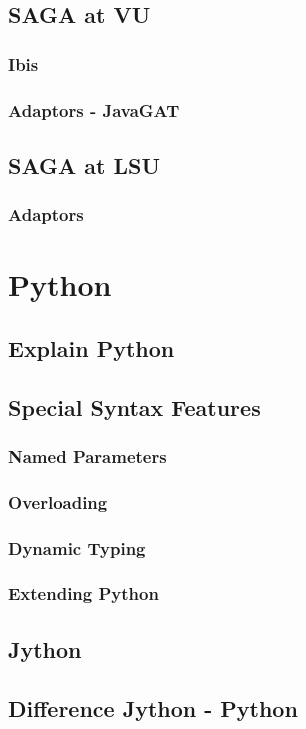 \documentclass[a4paper,11pt,onecolumn,notitlepage]{report}
\begin{document}
\subsection{SAGA at VU}
\subsubsection{Ibis}
\subsubsection{Adaptors - JavaGAT}
\subsection{SAGA at LSU}
\subsubsection{Adaptors}
\pagebreak[0]

\section{Python}
\subsection{Explain Python}
\subsection{Special Syntax Features}
\subsubsection{Named Parameters}
\subsubsection{Overloading}
\subsubsection{Dynamic Typing}
\subsubsection{Extending Python}
\subsection{Jython}
\subsection{Difference Jython - Python}
\pagebreak[0]
\end{document}
